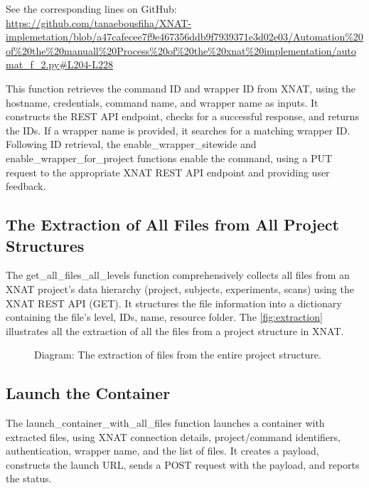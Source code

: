 \noindent\footnotesize See the corresponding lines on GitHub:\url{ https://github.com/tanaebousfiha/XNAT-implemetation/blob/a47cafecee7f9e467356ddb9f7939371e3d02e03/Automation%20of%20the%20manuall%20Process%20of%20the%20xnat%20implementation/automat_f_2.py#L204-L228}
\normalsize


This function retrieves the command ID and wrapper ID from XNAT, using the hostname, credentials, command name, and wrapper name as inputs. It constructs the REST API endpoint, checks for a successful response, and returns the IDs. If a wrapper name is provided, it searches for a matching wrapper ID. Following ID retrieval, the enable\_wrapper\_sitewide and enable\_wrapper\_for\_project functions enable the command, using a PUT request to the appropriate XNAT REST API endpoint and providing user feedback.

\subsection{The Extraction of All Files from All Project Structures}

The get\_all\_files\_all\_levels function comprehensively collects all files from an XNAT project's data hierarchy (project, subjects, experiments, scans) using the XNAT REST API (GET). It structures the file information into a dictionary containing the file's level, IDs, name, resource folder. The \autoref{fig:extraction} illustrates all the extraction of all the files from a project structure in XNAT.

\begin{figure}[H]
    \centering
    \def\svgwidth{0.7\linewidth}
    
    \caption{Diagram: The extraction of files from the entire project structure.}
    \label{fig:extraction}
\end{figure}

\subsection{Launch the Container}

The launch\_container\_with\_all\_files function launches a container with extracted files, using XNAT connection details, project/command identifiers, authentication, wrapper name, and the list of files. It creates a payload, constructs the launch URL, sends a POST request with the payload, and reports the status.




